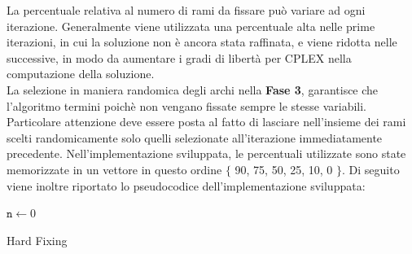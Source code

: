 La percentuale relativa al numero di rami da fissare può variare ad ogni iterazione. Generalmente viene utilizzata una percentuale alta nelle prime iterazioni, in cui la soluzione non è ancora stata raffinata, e viene ridotta nelle successive, in modo da aumentare i gradi di libertà per CPLEX nella computazione della soluzione.\\
La selezione in maniera randomica degli archi nella \textbf{Fase 3}, garantisce che l'algoritmo termini poichè non vengano fissate sempre le stesse variabili. 
Particolare attenzione deve essere posta al fatto di lasciare nell'insieme dei rami scelti randomicamente solo quelli selezionate all'iterazione immediatamente precedente. Nell'implementazione sviluppata, le percentuali utilizzate sono state memorizzate in un vettore in questo ordine $\lbrace$ 90, 75, 50, 25, 10, 0 $\rbrace$.
Di seguito viene inoltre riportato lo pseudocodice dell'implementazione sviluppata:\\
\begin{algorithm}[h]
\DontPrintSemicolon
{}
\BlankLine
$\mathtt{n \gets}0$\;
\BlankLine
{}
\caption{Hard Fixing}
\end{algorithm}

